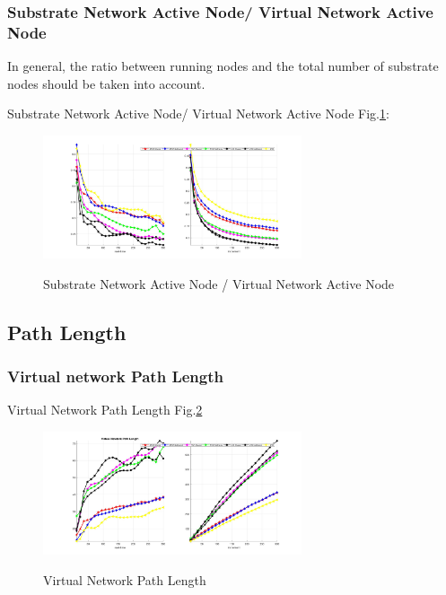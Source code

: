 \subsubsection{Substrate Network Active Node/ Virtual Network Active Node }
In general, the ratio between running nodes and the total number of substrate nodes should be taken into account.

Substrate Network Active Node/ Virtual Network Active Node Fig.\ref{fig:ActiveNodeSubVir2VirNet}:
\begin{figure}[htbp]
  \centering
  \includegraphics[width=3in]{Fig/ActiveNodeSubVir2VirNet}\\
  \caption{Substrate Network Active Node / Virtual Network Active Node}\label{fig:ActiveNodeSubVir2VirNet}
\end{figure}

\subsection{Path Length}
\subsubsection{Virtual network Path Length}

Virtual Network Path Length Fig.\ref{fig:PathLengthVirtualNetwork}
\begin{figure}[htbp]
  \centering
  \includegraphics[width=3in]{Fig/PathLengthVirtualNetwork}\\
  \caption{ Virtual Network Path Length}\label{fig:PathLengthVirtualNetwork}
\end{figure}


